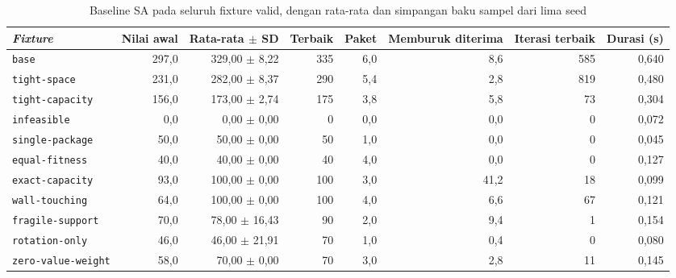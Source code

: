 \begin{table}[H]
    \centering
    \footnotesize
    \caption{Baseline SA pada seluruh fixture valid, dengan rata-rata dan simpangan baku sampel dari lima seed}
    \label{tab:sa-fixture-baseline}
    \begin{tabular}{@{}lrrrrrrr@{}}
        \toprule
        \textit{Fixture}           & Nilai awal & Rata-rata $\pm$ SD & Terbaik & Paket & Memburuk diterima & Iterasi terbaik & Durasi (s) \\
        \midrule
        \texttt{base}              & 297,0      & 329,00 $\pm$ 8,22  & 335     & 6,0   & 8,6               & 585             & 0,640      \\
        \texttt{tight-space}       & 231,0      & 282,00 $\pm$ 8,37  & 290     & 5,4   & 2,8               & 819             & 0,480      \\
        \texttt{tight-capacity}    & 156,0      & 173,00 $\pm$ 2,74  & 175     & 3,8   & 5,8               & 73              & 0,304      \\
        \texttt{infeasible}        & 0,0        & 0,00 $\pm$ 0,00    & 0       & 0,0   & 0,0               & 0               & 0,072      \\
        \texttt{single-package}    & 50,0       & 50,00 $\pm$ 0,00   & 50      & 1,0   & 0,0               & 0               & 0,045      \\
        \texttt{equal-fitness}     & 40,0       & 40,00 $\pm$ 0,00   & 40      & 4,0   & 0,0               & 0               & 0,127      \\
        \texttt{exact-capacity}    & 93,0       & 100,00 $\pm$ 0,00  & 100     & 3,0   & 41,2              & 18              & 0,099      \\
        \texttt{wall-touching}     & 64,0       & 100,00 $\pm$ 0,00  & 100     & 4,0   & 6,6               & 67              & 0,121      \\
        \texttt{fragile-support}   & 70,0       & 78,00 $\pm$ 16,43  & 90      & 2,0   & 9,4               & 1               & 0,154      \\
        \texttt{rotation-only}     & 46,0       & 46,00 $\pm$ 21,91  & 70      & 1,0   & 0,4               & 0               & 0,080      \\
        \texttt{zero-value-weight} & 58,0       & 70,00 $\pm$ 0,00   & 70      & 3,0   & 2,8               & 11              & 0,145      \\
        \bottomrule
    \end{tabular}
\end{table}

